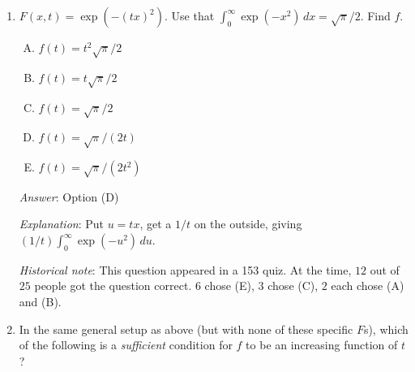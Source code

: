 \documentclass[10pt]{amsart}
\begin{document}
\begin{enumerate}
  \begin{enumerate}[(A)]
  \item $f(t) = \pi/t^3$
  \item $f(t) = \pi/(2t^3)$
  \item $f(t) = \pi/(4t^3)$
  \item $f(t) = \pi/(8t^3)$
  \item $f(t) = 3\pi/(8t^3)$
  \end{enumerate}

  {\em Answer}: Option (C)

  {\em Explanation}: Put in $\theta = \arctan(x/t)$. Substitute, and
  we get $(1/t^3) \int_0^{\pi/2} \cos^2\theta \,
  d\theta$. Integrating, we get $[\theta/2t^3 +
  \sin(2\theta)/4t^3]_0^{\pi/2}$. The trigonometric part vanishes
  between limits, and we are left with $\pi/(4t^3)$

  {\em Historical note}: This question appeared in a 153 quiz. At the
  time, $15$ out of $25$ people got this correct. $5$ chose (B), $2$
  chose (A), $1$ each chose (D) and (E), $1$ left the question blank.

\item $F(x,t) = \exp(-(tx)^2)$. Use that $\int_0^\infty \exp(-x^2) \, dx=
  \sqrt{\pi}/2$. Find $f$.

  \begin{enumerate}[(A)]
  \item $f(t) = t^2\sqrt{\pi}/2$
  \item $f(t) = t\sqrt{\pi}/2$
  \item $f(t) = \sqrt{\pi}/2$
  \item $f(t) = \sqrt{\pi}/(2t)$
  \item $f(t) = \sqrt{\pi}/(2t^2)$
  \end{enumerate}

  {\em Answer}: Option (D)

  {\em Explanation}: Put $u = tx$, get a $1/t$ on the outside, giving
  $(1/t) \int_0^\infty \exp(-u^2) \, du$.

  {\em Historical note}: This question appeared in a 153 quiz. At the
  time, $12$ out of $25$ people got the question correct. $6$ chose
  (E), $3$ chose (C), $2$ each chose (A) and (B).

\item In the same general setup as above (but with none of these
  specific $F$s), which of the following is a {\em sufficient}
  condition for $f$ to be an increasing function of $t$?


\end{enumerate}
\end{document}
